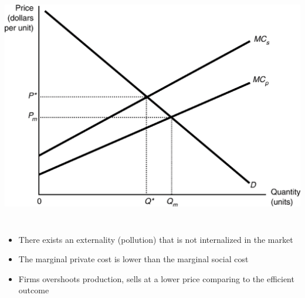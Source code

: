 \begin{frame}{}
\protect\hypertarget{section-4}{}

\includegraphics[width=\textwidth,height=4.16667in]{figures/m3_marginal_social_cost.png}

\end{frame}

\begin{frame}{}
\protect\hypertarget{section-5}{}

\begin{itemize}
\tightlist
\item
  There exists an externality (pollution) that is not internalized in
  the market
\item
  The marginal private cost is lower than the marginal social cost
\item
  Firms overshoots production, sells at a lower price comparing to the
  efficient outcome
\end{itemize}

\end{frame}

